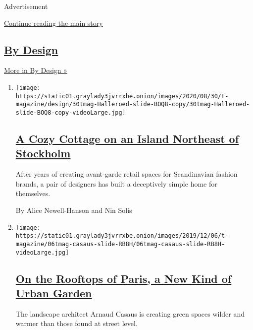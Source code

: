 Advertisement

\protect\hyperlink{after-mid1}{Continue reading the main story}

\hypertarget{by-design-1}{%
\subsection{\texorpdfstring{\href{/column/by-design}{By
Design}}{By Design}}\label{by-design-1}}

\href{/column/by-design}{More in By Design »}

\begin{enumerate}
\def\labelenumi{\arabic{enumi}.}
\item
  \texttt{[image: https://static01.graylady3jvrrxbe.onion/images/2020/08/30/t-magazine/design/30tmag-Halleroed-slide-BOQ8-copy/30tmag-Halleroed-slide-BOQ8-copy-videoLarge.jpg]}

  \hypertarget{a-cozy-cottage-on-an-island-northeast-of-stockholm}{%
  \subsection{\texorpdfstring{\href{/2020/08/26/t-magazine/cottage-stockholm-home-design.html}{A
  Cozy Cottage on an Island Northeast of
  Stockholm}}{A Cozy Cottage on an Island Northeast of Stockholm}}\label{a-cozy-cottage-on-an-island-northeast-of-stockholm}}

  After years of creating avant-garde retail spaces for Scandinavian
  fashion brands, a pair of designers has built a deceptively simple
  home for themselves.

  By Alice Newell-Hanson and Nin Solis
\item
  \texttt{[image: https://static01.graylady3jvrrxbe.onion/images/2019/12/06/t-magazine/06tmag-casaus-slide-RB8H/06tmag-casaus-slide-RB8H-videoLarge.jpg]}

  \hypertarget{on-the-rooftops-of-paris-a-new-kind-of-urban-garden}{%
  \subsection{\texorpdfstring{\href{/2019/12/06/t-magazine/paris-rooftop-garden.html}{On
  the Rooftops of Paris, a New Kind of Urban
  Garden}}{On the Rooftops of Paris, a New Kind of Urban Garden}}\label{on-the-rooftops-of-paris-a-new-kind-of-urban-garden}}

  The landscape architect Arnaud Casaus is creating green spaces wilder
  and warmer than those found at street level.


\end{enumerate}
